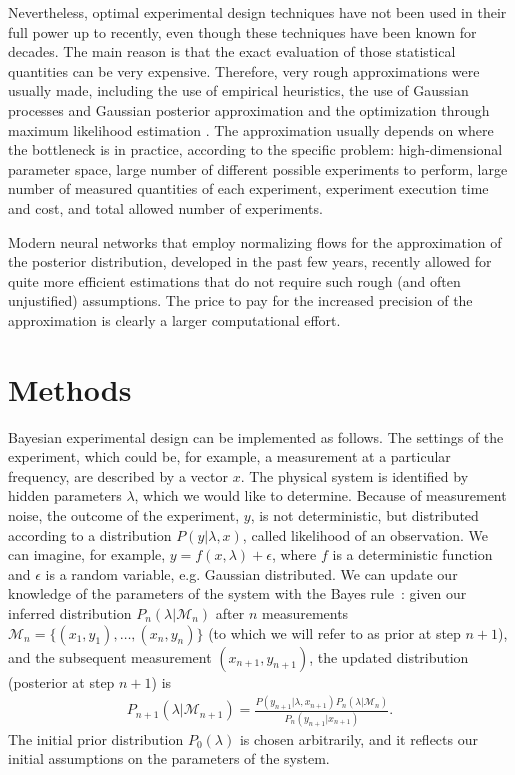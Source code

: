 \documentclass[10pt]{iopart}  %
\begin{document}
Nevertheless, optimal experimental design techniques have not been used in their full power up to recently, even though these techniques have been known for decades.
The main reason is that the exact evaluation of those statistical quantities can be very expensive.
Therefore, very rough approximations were usually made, including the use of empirical heuristics, the use of Gaussian processes \cite{liang_benchmarking_2021} and Gaussian posterior approximation \cite{vargas-hernandez_extrapolating_2018, duris_bayesian_2020} and the optimization through maximum likelihood estimation \cite{leclercq_bayesian_2018}.
The approximation usually depends on where the bottleneck is in practice, according to the specific problem: high-dimensional parameter space, large number of different possible experiments to perform, large number of measured quantities of each experiment, experiment execution time and cost, and total allowed number of experiments.

Modern neural networks \cite{goodfellow_deep_2016} that employ normalizing flows \cite{dinh_nice_2015, kobyzev_normalizing_2021} for the approximation of the posterior distribution, developed in the past few years, recently allowed for quite more efficient estimations \cite{foster_variational_2019,kleinegesse_bayesian_2020} that do not require such rough (and often unjustified) assumptions.
The price to pay for the increased precision of the approximation is clearly a larger computational effort.


\section{Methods}
\label{sec:methods}

Bayesian experimental design can be implemented as follows.
The settings of the experiment, which could be, for example, a measurement at a particular frequency, are described by a vector $x$.
The physical system is identified by hidden parameters $\lambda$, which we would like to determine.
Because of measurement noise, the outcome of the experiment, $y$, is not deterministic, but distributed according to a distribution $P(y|\lambda, x)$, called likelihood of an observation.
We can imagine, for example, $y = f(x,\lambda) + \epsilon$,  where $f$ is a deterministic function and $\epsilon$ is a random variable, e.g. Gaussian distributed.
We can update our knowledge of the parameters of the system with the Bayes rule~\cite{papoulis_probability_2009}:
given our inferred distribution $P_n(\lambda|\mathcal{M}_n)$ after $n$ measurements $\mathcal{M}_n=\{(x_1,y_1),\ldots, (x_n, y_n)\}$ (to which we will refer to as prior at step $n+1$), and the subsequent measurement $(x_{n+1}, y_{n+1})$, the updated distribution (posterior at step $n+1$) is
\begin{align}
    \label{eq:bayes}
    P_{n+1}(\lambda|\mathcal{M}_{n+1}) =\frac{P(y_{n+1}|\lambda, x_{n+1})P_n(\lambda| \mathcal{M}_n)}{P_n(y_{n+1}|x_{n+1})}.
\end{align}
The initial prior distribution $P_0(\lambda)$ is chosen arbitrarily, and it reflects our initial assumptions on the parameters of the system.
\end{document}
